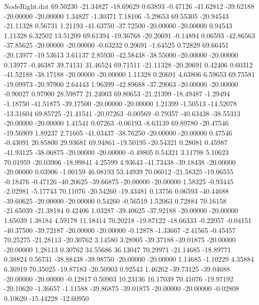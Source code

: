 \begin{filecontents}{NodeRight.dat}
  69.50230  -21.34827  -18.69629     0.63893   -0.47126  -41.62812  -39.62188  -20.00000  -20.00000    1.34827   -1.30371    7.18106   -5.29653
  69.55305  -20.94543  -21.11328     0.56731    1.21193  -41.63750  -37.72500  -20.00000  -20.00000    0.94543    1.11328    6.32502   13.51209
  69.61394  -19.36768  -20.20691    -0.14894    0.06593  -42.86563  -37.85625  -20.00000  -20.00000   -0.63232    0.20691   -1.64525    0.72829
  69.66451  -20.13977  -19.53613     3.61137    2.85930  -42.58438  -38.55000  -20.00000  -20.00000    0.13977   -0.46387   39.74131   31.46524
  69.71511  -21.11328  -20.20691     0.42406    0.60312  -41.52188  -38.17188  -20.00000  -20.00000    1.11328    0.20691    4.63806    6.59653
  69.75581  -19.09973  -20.97900     2.64443    1.96399  -42.89688  -37.29063  -20.00000  -20.00000   -0.90027    0.97900   28.59877   21.24003
  69.80653  -21.21399  -18.49487    -1.29494   -1.18750  -41.51875  -39.17500  -20.00000  -20.00000    1.21399   -1.50513  -14.52078  -13.31604
  69.85725  -21.41541  -20.07263    -0.00569   -0.79357  -40.63438  -38.55313  -20.00000  -20.00000    1.41541    0.07263   -0.06193   -8.63139
  69.89780  -20.47546  -19.56909     1.89237    2.71605  -41.03437  -38.76250  -20.00000  -20.00000    0.47546   -0.43091   20.85800   29.93681
  69.94861  -19.50195  -20.54321     0.28081    0.45987  -41.93125  -38.06875  -20.00000  -20.00000   -0.49805    0.54321    3.11798    5.10623
  70.01959  -20.03906  -18.99841     4.25599    4.93643  -41.73438  -39.18438  -20.00000  -20.00000    0.03906   -1.00159   46.08193   53.44939
  70.06012  -21.58325  -19.06555    -0.18476   -0.47126  -40.20625  -39.66875  -20.00000  -20.00000    1.58325   -0.93445   -2.02981   -5.17743
  70.11076  -20.54260  -19.43481     0.13756    0.06593  -40.44688  -39.60625  -20.00000  -20.00000    0.54260   -0.56519    1.52063    0.72884
  70.16158  -21.65039  -21.38184     0.42406    1.03287  -39.40625  -37.92188  -20.00000  -20.00000    1.65039    1.38184    4.59178   11.18414
  70.20218  -19.87122  -18.66333    -0.22057   -0.04151  -40.37500  -39.72187  -20.00000  -20.00000   -0.12878   -1.33667   -2.41565   -0.45457
  70.25275  -21.28113  -20.30762     3.14580    3.28905  -39.37188  -39.01875  -20.00000  -20.00000    1.28113    0.30762   34.55686   36.13047
  70.29971  -21.14685  -18.89771     0.38824    0.56731  -38.88438  -39.98750  -20.00000  -20.00000    1.14685   -1.10229    4.35884    6.36919
  70.35025  -19.87183  -20.50903     0.92543    1.46262  -39.73125  -39.04688  -20.00000  -20.00000   -0.12817    0.50903   10.23136   16.17039
  70.41076  -19.97192  -20.10620    -1.36657   -1.11588  -39.86875  -39.01875  -20.00000  -20.00000   -0.02808    0.10620  -15.44228  -12.60950

\end{filecontents}
